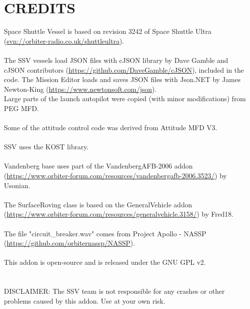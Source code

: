 \documentclass[Space_Shuttle_Vessel_Manual.tex]{subfiles}
\begin{document}
\section{CREDITS}
Space Shuttle Vessel is based on revision 3242 of Space Shuttle Ultra (\url{svn://orbiter-radio.co.uk/shuttleultra}).\\
\\
The SSV vessels load JSON files with cJSON library by Dave Gamble and cJSON contributors (\url{https://github.com/DaveGamble/cJSON}), included in the code. The Mission Editor loads and saves JSON files with Json.NET by James Newton-King (\url{https://www.newtonsoft.com/json}).
\\
Large parts of the launch autopilot were copied (with minor modifications) from PEG MFD.\\
\\
Some of the attitude control code was derived from Attitude MFD V3.\\
\\
SSV uses the KOST library.\\
\\
Vandenberg base uses part of the VandenbergAFB-2006 addon (\url{https://www.orbiter-forum.com/resources/vandenbergafb-2006.3523/}) by Usonian.\\
\\
The SurfaceRoving class is based on the GeneralVehicle addon (\url{https://www.orbiter-forum.com/resources/generalvehicle.3158/}) by Fred18.\\
\\
The file "circuit\_breaker.wav" comes from Project Apollo - NASSP (\url{https://github.com/orbiternassp/NASSP}).\\
\\
This addon is open-source and is released under the GNU GPL v2.\\
\\
\\
DISCLAIMER: The SSV team is not responsible for any crashes or other problems caused by this addon. Use at your own risk.
\end{document}
